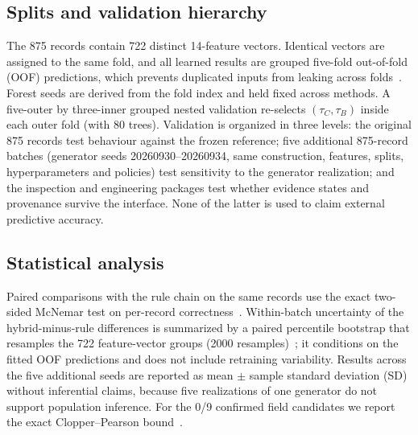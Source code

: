 \documentclass[journal]{IEEEtran}
\begin{document}
\subsection{Splits and validation hierarchy}
The 875 records contain 722 distinct 14-feature vectors. Identical vectors are assigned to the same fold, and all learned results are grouped five-fold out-of-fold (OOF) predictions, which prevents duplicated inputs from leaking across folds~\cite{Kaufman2012,Roberts2017}. Forest seeds are derived from the fold index and held fixed across methods. A five-outer by three-inner grouped nested validation re-selects $(\tau_C,\tau_B)$ inside each outer fold (with 80 trees). Validation is organized in three levels: the original 875 records test behaviour against the frozen reference; five additional 875-record batches (generator seeds 20260930--20260934, same construction, features, splits, hyperparameters and policies) test sensitivity to the generator realization; and the inspection and engineering packages test whether evidence states and provenance survive the interface. None of the latter is used to claim external predictive accuracy.

\subsection{Statistical analysis}
Paired comparisons with the rule chain on the same records use the exact two-sided McNemar test on per-record correctness~\cite{McNemar1947,Dietterich1998}. Within-batch uncertainty of the hybrid-minus-rule differences is summarized by a paired percentile bootstrap that resamples the 722 feature-vector groups (2000 resamples)~\cite{Efron1993}; it conditions on the fitted OOF predictions and does not include retraining variability. Results across the five additional seeds are reported as mean $\pm$ sample standard deviation (SD) without inferential claims, because five realizations of one generator do not support population inference. For the 0/9 confirmed field candidates we report the exact Clopper--Pearson bound~\cite{Clopper1934}.
\end{document}
